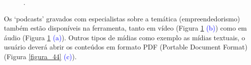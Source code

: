 \begin{figure}[H]
.
\label{figura_42}
\end{figure}
 

Os ‘podcasts’ gravados com especialistas sobre a temática (empreendedorismo) também estão disponíveis na ferramenta, tanto em vídeo (Figura \ref{figura_42} \textcolor{blue}{(b)}) como em áudio (Figura \ref{figura_42} \textcolor{blue}{(a)}). Outros tipos de mídias como exemplo as mídias textuais, o usuário deverá abrir os conteúdos em formato PDF (Portable Document Format) (Figura \ref{figura_44} \textcolor{blue}{(c)}).

